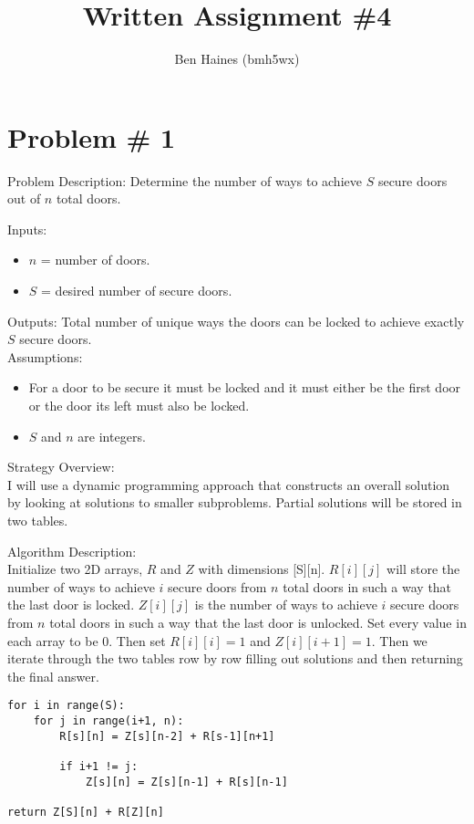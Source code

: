 \documentclass{article}
\begin{document}
\title{Written Assignment \#4}
\author{Ben Haines (bmh5wx)}

\section*{Problem \# 1}
Problem Description: Determine the number of ways to achieve $S$ secure doors out of $n$ total doors.

Inputs:
\begin{itemize}
    \item $n$ = number of doors.
    \item $S$ = desired number of secure doors.
\end{itemize}

Outputs: Total number of unique ways the doors can be locked to achieve exactly $S$ secure doors.\\

Assumptions:
\begin{itemize}
    \item For a door to be secure it must be locked and it must either be the first door or the door its left must also be locked.
    \item $S$ and $n$ are integers.
\end{itemize}

Strategy Overview:\\
I will use a dynamic programming approach that constructs an overall solution by looking at solutions to smaller subproblems. Partial solutions will be stored in two tables. 

Algorithm Description:\\
Initialize two 2D arrays, $R$ and $Z$ with dimensions [S][n]. $R[i][j]$ will store the number of ways to achieve $i$ secure doors from $n$ total doors in such a way that the last door is locked. $Z[i][j]$ is the number of ways to achieve $i$ secure doors from $n$ total doors in such a way that the last door is unlocked. Set every value in each array to be 0. Then set $R[i][i] = 1$ and $Z[i][i+1] = 1$. Then we iterate through the two tables row by row filling out solutions and then returning the final answer.
\begin{lstlisting}
for i in range(S):
    for j in range(i+1, n):
        R[s][n] = Z[s][n-2] + R[s-1][n+1]

        if i+1 != j:
            Z[s][n] = Z[s][n-1] + R[s][n-1]
            
return Z[S][n] + R[Z][n]
\end{lstlisting}
\end{document}
